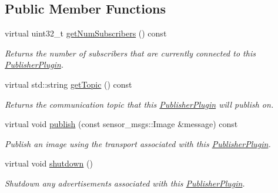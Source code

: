 \subsection*{Public Member Functions}
\begin{DoxyCompactItemize}
\item 
\hypertarget{classimage__transport_1_1_simple_publisher_plugin_a58697b43b16d32531b4f67a7c8709f20}{virtual uint32\-\_\-t \hyperlink{classimage__transport_1_1_simple_publisher_plugin_a58697b43b16d32531b4f67a7c8709f20}{get\-Num\-Subscribers} () const }\label{classimage__transport_1_1_simple_publisher_plugin_a58697b43b16d32531b4f67a7c8709f20}

\begin{DoxyCompactList}\small\item\em Returns the number of subscribers that are currently connected to this \hyperlink{classimage__transport_1_1_publisher_plugin}{Publisher\-Plugin}. \end{DoxyCompactList}\item 
\hypertarget{classimage__transport_1_1_simple_publisher_plugin_a24f9923dbde675f1693b1be252805918}{virtual std\-::string \hyperlink{classimage__transport_1_1_simple_publisher_plugin_a24f9923dbde675f1693b1be252805918}{get\-Topic} () const }\label{classimage__transport_1_1_simple_publisher_plugin_a24f9923dbde675f1693b1be252805918}

\begin{DoxyCompactList}\small\item\em Returns the communication topic that this \hyperlink{classimage__transport_1_1_publisher_plugin}{Publisher\-Plugin} will publish on. \end{DoxyCompactList}\item 
\hypertarget{classimage__transport_1_1_simple_publisher_plugin_a409f2078d4aa3466e843404b88cfe101}{virtual void \hyperlink{classimage__transport_1_1_simple_publisher_plugin_a409f2078d4aa3466e843404b88cfe101}{publish} (const sensor\-\_\-msgs\-::\-Image \&message) const }\label{classimage__transport_1_1_simple_publisher_plugin_a409f2078d4aa3466e843404b88cfe101}

\begin{DoxyCompactList}\small\item\em Publish an image using the transport associated with this \hyperlink{classimage__transport_1_1_publisher_plugin}{Publisher\-Plugin}. \end{DoxyCompactList}\item 
\hypertarget{classimage__transport_1_1_simple_publisher_plugin_a62e2d4cce1756530fbf6a323b1a00c59}{virtual void \hyperlink{classimage__transport_1_1_simple_publisher_plugin_a62e2d4cce1756530fbf6a323b1a00c59}{shutdown} ()}\label{classimage__transport_1_1_simple_publisher_plugin_a62e2d4cce1756530fbf6a323b1a00c59}

\begin{DoxyCompactList}\small\item\em Shutdown any advertisements associated with this \hyperlink{classimage__transport_1_1_publisher_plugin}{Publisher\-Plugin}. \end{DoxyCompactList}\end{DoxyCompactItemize}
